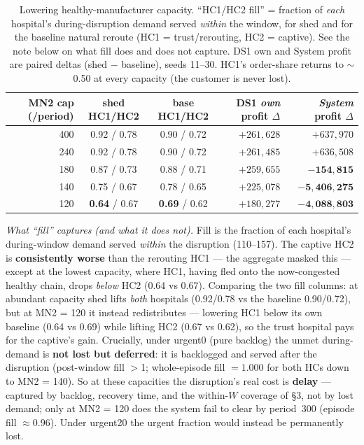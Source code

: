 \documentclass[11pt]{article}
\begin{document}
\begin{table}[h]
\centering\small
\caption{Lowering healthy-manufacturer capacity. ``HC1/HC2 fill'' = fraction of \emph{each}
hospital's during-disruption demand served \emph{within} the window, for shed and for the
baseline natural reroute (HC1 = trust/rerouting, HC2 = captive). See the note below on what fill
does and does not capture. DS1 own and System profit are paired deltas (shed $-$ baseline),
seeds 11--30. HC1's order-share returns to $\sim$0.50 at every capacity (the customer is never lost).}
\begin{tabular}{r c c r r}
\toprule
MN2 cap (/period) & shed HC1/HC2 & base HC1/HC2 & DS1 \emph{own} profit $\Delta$ & \emph{System} profit $\Delta$ \\
\midrule
400 & 0.92 / 0.78 & 0.90 / 0.72 & $+261{,}628$ & $+637{,}970$ \\
240 & 0.92 / 0.78 & 0.90 / 0.72 & $+261{,}485$ & $+636{,}508$ \\
180 & 0.87 / 0.73 & 0.88 / 0.71 & $+259{,}655$ & $\mathbf{-154{,}815}$ \\
140 & 0.75 / 0.67 & 0.78 / 0.65 & $+225{,}078$ & $\mathbf{-5{,}406{,}275}$ \\
120 & \textbf{0.64} / 0.67 & \textbf{0.69} / 0.62 & $+180{,}277$ & $\mathbf{-4{,}088{,}803}$ \\
\bottomrule
\end{tabular}

\par\footnotesize\emph{What ``fill'' captures (and what it does not).} Fill is the fraction of
each hospital's during-window demand served \emph{within} the disruption (110--157). The captive
HC2 is \textbf{consistently worse} than the rerouting HC1 --- the aggregate masked this --- except
at the lowest capacity, where HC1, having fled onto the now-congested healthy chain, drops
\emph{below} HC2 (0.64 vs 0.67). Comparing the two fill columns: at abundant capacity shed lifts
\emph{both} hospitals (0.92/0.78 vs the baseline 0.90/0.72), but at MN2 = 120 it instead
redistributes --- lowering HC1 below its own baseline (0.64 vs 0.69) while lifting HC2
(0.67 vs 0.62), so the trust hospital pays for the captive's gain. Crucially, under urgent0
(pure backlog) the unmet during-demand
is \textbf{not lost but deferred}: it is backlogged and served after the disruption (post-window
fill $>$1; whole-episode fill $= 1.000$ for both HCs down to MN2 = 140). So at these capacities
the disruption's real cost is \textbf{delay} --- captured by backlog, recovery time, and the
within-$W$ coverage of \S3, not by lost demand; only at MN2 = 120 does the system fail to clear by
period~300 (episode fill $\approx$0.96). Under urgent20 the urgent fraction would instead be
permanently lost.\normalsize
\end{table}
\end{document}
